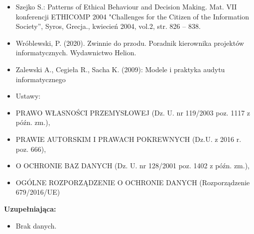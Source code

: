 \documentclass[12pt, a4paper]{article}
\begin{document}
\begin{itemize}
  \item Szejko S.: Patterns of Ethical Behaviour and Decision Making. Mat. VII konferencji ETHICOMP 2004 "Challenges for the Citizen of the Information Society”, Syros, Grecja., kwiecień 2004, vol.2, str. 826 – 838.
  \item Wróblewski, P. (2020).  Zwinnie do przodu. Poradnik kierownika projektów informatycznych.  Wydawnictwo Helion.
  \item Zalewski A., Cegieła R., Sacha K. (2009): Modele i praktyka audytu informatycznego
  \item Ustawy:
  \item PRAWO WŁASNOŚCI PRZEMYSŁOWEJ (Dz. U. nr 119/2003 poz. 1117 z późn. zm.),
  \item PRAWIE AUTORSKIM I PRAWACH POKREWNYCH (Dz.U. z 2016 r. poz. 666),
  \item O OCHRONIE BAZ DANYCH (Dz. U. nr 128/2001 poz. 1402 z późn. zm.),
  \item OGÓLNE ROZPORZĄDZENIE O OCHRONIE DANYCH (Rozporządzenie 679/2016/UE)
\end{itemize}

\textbf{Uzupełniająca:}
\begin{itemize}
  \item Brak danych.
\end{itemize}
\end{document}
